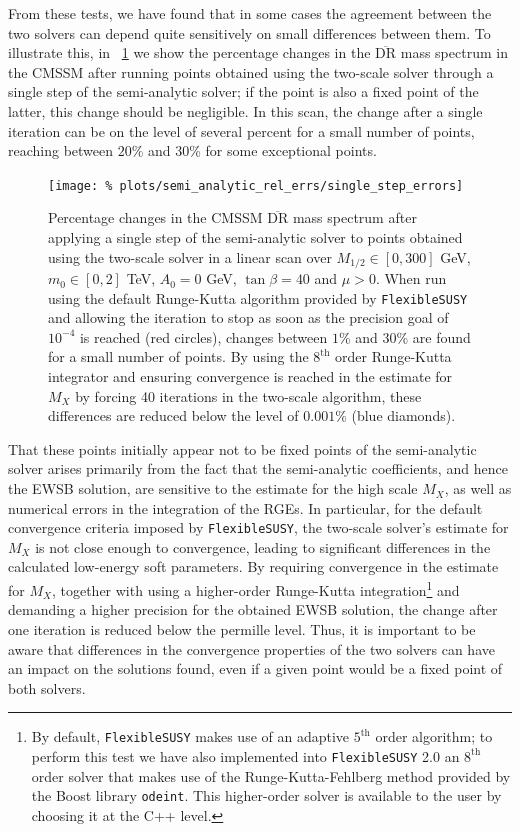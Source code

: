 \documentclass[final,3p,11pt,pdflatex]{elsarticle}
\makeatletter
\newcommand{\fs}{\texttt{FlexibleSUSY}\@\xspace}
\newcommand{\fstwo}{\fs 2.0\@\xspace}
\newcommand{\ol}[1]{\overline{#1}}
\newcommand{\DRbar}{\ensuremath{\ol{\text{DR}}}\xspace}
\newcommand{\figref}[1]{\figurename~\ref{#1}}
\newcommand{\azero}{\ensuremath{A_0}\xspace}
\newcommand{\mhalf}{\ensuremath{M_{1/2}}\xspace}
\newcommand{\mzero}{\ensuremath{m_0}\xspace}
\makeatother
\begin{document}
From these tests, we have found that in some cases the agreement
between the two solvers can depend quite sensitively on small differences
between them.  To illustrate this, in \figref{fig:semi_analytic_differences}
we show the percentage changes in the \DRbar mass spectrum in the CMSSM after
running points obtained using the two-scale solver through a single step of
the semi-analytic solver; if the point is also a fixed point of the latter,
this change should be negligible.  In this
scan, the change after a single iteration can be on the level of several
percent for a small number of points, reaching between $20$\% and $30$\% for
some exceptional points.
%
\begin{figure}[tbh]
  \centering
  \texttt{[image: \%
    plots/semi\_analytic\_rel\_errs/single\_step\_errors]}
  \caption{Percentage changes in the CMSSM \DRbar mass spectrum after
    applying a single step of the semi-analytic solver to points obtained
    using the two-scale solver in a linear scan over $\mhalf \in
    [0,300]$ GeV, $\mzero \in [0,2]$ TeV, $\azero = 0$ GeV, $\tan\beta = 40$ and
    $\mu > 0$.  When run using the default Runge-Kutta algorithm provided
    by \fs and allowing the iteration to stop as soon as the precision goal of
    $10^{-4}$ is reached (red circles), changes between $1$\% and $30$\% are
    found for a small number of points.  By using the $8^{\text{th}}$ order
    Runge-Kutta integrator and ensuring convergence is reached in the
    estimate for $M_X$ by forcing 40 iterations in the two-scale algorithm,
    these differences are reduced below the level of $0.001$\% (blue
    diamonds).}
  \label{fig:semi_analytic_differences}
\end{figure}
%
That these points initially appear not to be fixed points of the semi-analytic
solver arises primarily from the fact that the semi-analytic coefficients,
and hence the EWSB solution, are sensitive to the estimate for the
high scale $M_X$, as well as numerical errors in the integration of the RGEs.
In particular, for the default convergence criteria imposed by \fs, the
two-scale solver's estimate for $M_X$ is not close enough to convergence,
leading to significant differences in the calculated low-energy soft
parameters.  By requiring convergence in the estimate for $M_X$, together with
using a higher-order Runge-Kutta integration\footnote{By default, \fs makes
  use of an adaptive $5^{\text{th}}$ order algorithm; to perform this test we
  have also implemented into \fstwo an $8^{\text{th}}$ order solver that makes
  use of the Runge-Kutta-Fehlberg method provided by the Boost library
  \texttt{odeint}.  This higher-order solver is available to the user by
  choosing it at the C++ level.} and demanding a higher precision for the
obtained EWSB solution, the change after one iteration is reduced below the
permille level.  Thus, it is important to be aware that differences in the
convergence properties of the two solvers can have an impact on the solutions
found, even if a given point would be a fixed point of both solvers.
\end{document}
